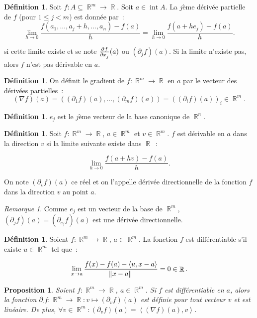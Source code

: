\documentclass{article}
\DeclareMathOperator{\intr}{int}
\DeclareMathOperator{\R}{\mathbb R}
\newcommand{\scpr}[2]{{\left\langle#1, #2\right\rangle}}
\newcommand{\frmr}[2]{#1 : #2 \subseteq \R^m \to \R}
\newtheorem{prp}[thm]{Proposition}
\theoremstyle{definition}
\newtheorem{déf}[thm]{Définition}
\theoremstyle{remark}
\newtheorem*{rmq}{Remarque}
\begin{document}
		\begin{déf} Soit $\frmr fA$. Soit $a \in \intr A$. La $j$ème dérivée partielle de $f$ (pour $1 \leq j < m$) est  donnée par~:
		\[\lim_{h \to 0}\frac {f(a_1, \ldots, a_j+h, \ldots, a_n) - f(a)}h = \lim_{h \to 0}\frac {f(a+he_j)-f(a)}h.\]

		si cette limite existe et se note $\pd f{x_j}(a)$ ou $(\partial_jf)(a)$. Si la limite n'existe pas, alors $f$ n'est pas dérivable en $a$.
		\end{déf}

		\begin{déf} On définit le gradient de $f : \R^m \to \R$ en $a$ par le vecteur des dérivées partielles~:
		\[(\nabla f)(a) = ((\partial_1 f)(a), \ldots, (\partial_m f)(a)) = ((\partial_i f)(a))_i \in \R^m.\]
		\end{déf}

		\begin{déf} $e_j$ est le $j$ème vecteur de la base canonique de $\R^n$. \end{déf}

		\begin{déf} Soit $f : \R^m \to \R$, $a \in \R^m$ et $v \in \R^m$. $f$ est dérivable en $a$ dans la direction $v$ si la limite suivante
		existe dans $\R$~:

		\[\lim_{h \to 0}\frac {f(a+hv)-f(a)}h.\]

		On note $(\partial_v f)(a)$ ce réel et on l'appelle dérivée directionnelle de la fonction $f$ dans la direction $v$ au point $a$. \end{déf}

		\begin{rmq} Comme $e_j$ est un vecteur de la base de $\R^m$, $(\partial_j f)(a) = (\partial_{e_j} f)(a)$ est une dérivée directionnelle. \end{rmq}

		\begin{déf} Soient $f : \R^m \to \R$, $a \in \R^m$. La fonction $f$ est différentiable s'il existe $u \in \R^m$ tel que~:

		\[\lim_{x \to a}\frac {f(x) - f(a) - \scpr u{x-a}}{\norm {x-a}} = 0 \in \R.\]
		\end{déf}

		\begin{prp} Soient $f : \R^m \to \R$, $a \in \R^m$. Si $f$ est différentiable en $a$, alors la fonction
		$\partial_\cdot f : \R^m \to \R : v \mapsto (\partial_v f)(a)$ est définie pour tout vecteur $v$ et est linéaire. De plus,
		$\forall v \in \R^m : (\partial_v f)(a) = \scpr {(\nabla f)(a)}v$. \end{prp}
\end{document}

